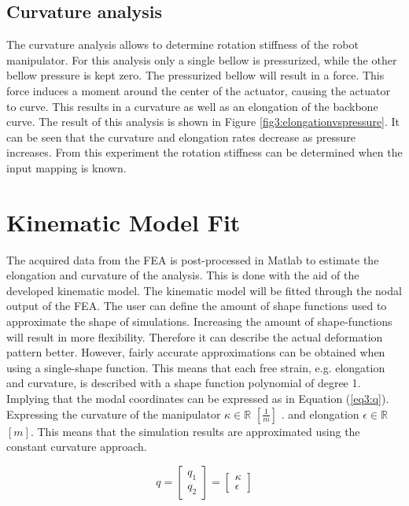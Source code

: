 \subsection{Curvature analysis}

The curvature analysis allows to determine rotation stiffness of the robot manipulator. For this analysis only a single bellow is pressurized, while the other bellow pressure is kept zero. The pressurized bellow will result in a force. This force induces a moment around the center of the actuator, causing the actuator to curve. This results in a curvature as well as an elongation of the backbone curve. The result of this analysis is shown in Figure \ref{fig3:elongationvspressure}. It can be seen that the curvature and elongation rates decrease as pressure increases. From this experiment the rotation stiffness can be determined when the input mapping is known.  


\section{Kinematic Model Fit}
\label{sec3:KinematicModelFit}

The acquired data from the FEA is post-processed in Matlab to estimate the elongation and curvature of the analysis. This is done with the aid of the developed kinematic model. The kinematic model will be fitted through the nodal output of the FEA. The user can define the amount of shape functions used to approximate the shape of simulations. Increasing the amount of shape-functions will result in more flexibility. Therefore it can describe the actual deformation pattern better. However, fairly accurate approximations can be obtained when using a single-shape function. This means that each free strain, e.g. elongation and curvature, is described with a shape function polynomial of degree 1. Implying that the modal coordinates can be expressed as in Equation (\ref{eq3:q}). Expressing the curvature of the manipulator
 $\kappa \in \mathbb{R}$ $[\frac{1}{m}]$ . and elongation $\epsilon \in \mathbb{R}$ $[m]$.  This means that the simulation results are approximated using the constant curvature approach.

\begin{equation}
    q =  \begin{bmatrix} q_1 \\ q_2 \end{bmatrix}     = \begin{bmatrix} \kappa \\ \epsilon \end{bmatrix} 
    \label{eq3:q}
\end{equation}




